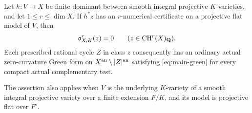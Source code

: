 \begin{theorem}\label{thm:finite-numerical}
Let $h:V\to X$ be finite dominant between smooth integral
projective $K$-varieties, and let $1\le r\le\dim X$.  If $h^*z$
has an $r$-numerical certificate on a projective flat model of $V$,
then
\[
                     \mathfrak o^r_{X,K}(z)=0
                     \qquad(z\in\operatorname{CH}^r(X)_{\mathbf Q}).
\]
Each prescribed rational cycle $Z$ in class $z$ consequently has
an ordinary actual zero-curvature Green form on
$X^{\mathrm{an}}\setminus|Z|^{\mathrm{an}}$ satisfying \eqref{eq:main-green}
for every compact actual complementary test.

The assertion also applies when $V$ is the underlying $K$-variety
of a smooth integral projective variety over a finite extension
$F/K$, and its model is projective flat over $F^\circ$.
\end{theorem}

